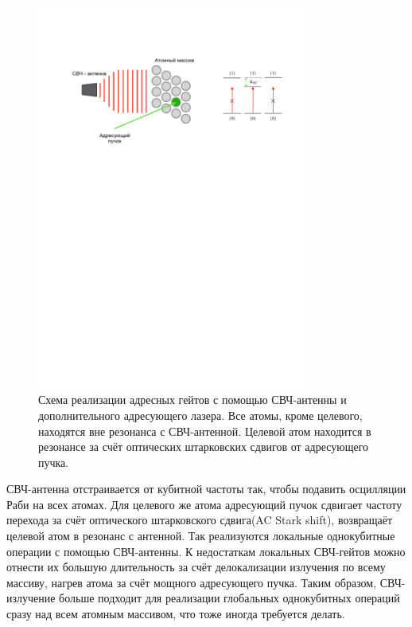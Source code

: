 \begin{figure}[ht]
	\centering
	\includegraphics[width=0.8\textwidth]{images/shf_gates.pdf}
	\caption{Схема реализации адресных гейтов с помощью СВЧ-антенны и дополнительного адресующего лазера. Все атомы, кроме целевого, находятся вне резонанса с СВЧ-антенной. Целевой атом находится в резонансе за счёт оптических штарковских сдвигов от адресующего пучка.}
	\label{fig:shf_scheme}
\end{figure}

СВЧ-антенна отстраивается от кубитной частоты так, чтобы подавить осцилляции Раби на всех атомах. Для целевого же атома адресующий пучок сдвигает частоту перехода за счёт оптического штарковского сдвига(AC Stark shift), возвращаёт целевой атом в резонанс с антенной. Так реализуются локальные однокубитные операции с помощью СВЧ-антенны. К недостаткам локальных СВЧ-гейтов можно отнести их большую длительность за счёт делокализации излучения по всему массиву, нагрев атома за счёт мощного адресующего пучка. Таким образом, СВЧ-излучение больше подходит для реализации глобальных однокубитных операций сразу над всем атомным массивом, что тоже иногда требуется делать. 

